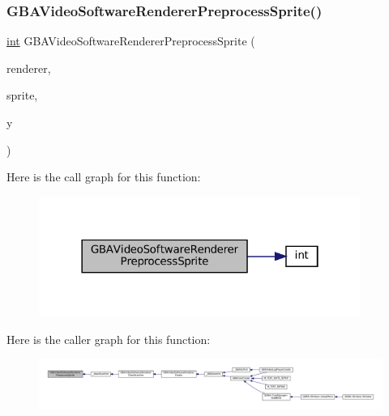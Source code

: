\subsubsection{\texorpdfstring{G\+B\+A\+Video\+Software\+Renderer\+Preprocess\+Sprite()}{GBAVideoSoftwareRendererPreprocessSprite()}}
{\footnotesize\ttfamily \mbox{\hyperlink{ioapi_8h_a787fa3cf048117ba7123753c1e74fcd6}{int}} G\+B\+A\+Video\+Software\+Renderer\+Preprocess\+Sprite (\begin{DoxyParamCaption}\item[{struct G\+B\+A\+Video\+Software\+Renderer $\ast$}]{renderer,  }\item[{struct G\+B\+A\+Obj $\ast$}]{sprite,  }\item[{\mbox{\hyperlink{ioapi_8h_a787fa3cf048117ba7123753c1e74fcd6}{int}}}]{y }\end{DoxyParamCaption})}

Here is the call graph for this function\+:
\nopagebreak
\begin{figure}[H]
\begin{center}
\leavevmode
\includegraphics[width=298pt]{software-obj_8c_a1f995eed921e1b4e0963fab4daf5e2da_cgraph}
\end{center}
\end{figure}
Here is the caller graph for this function\+:
\nopagebreak
\begin{figure}[H]
\begin{center}
\leavevmode
\includegraphics[width=350pt]{software-obj_8c_a1f995eed921e1b4e0963fab4daf5e2da_icgraph}
\end{center}
\end{figure}
